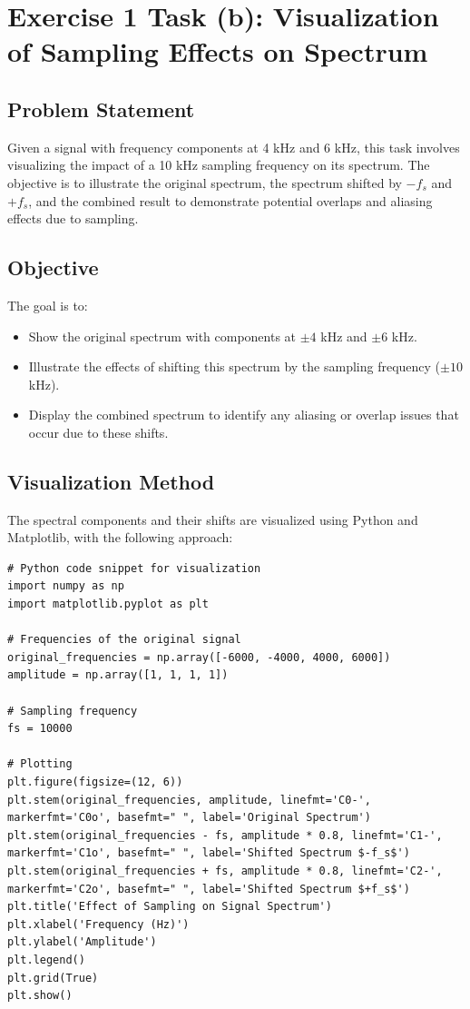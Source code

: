 
\item[(b)]
\section{Exercise 1 Task (b): Visualization of Sampling Effects on Spectrum}

\subsection{Problem Statement}
Given a signal with frequency components at 4 kHz and 6 kHz, this task involves visualizing the impact of a 10 kHz sampling frequency on its spectrum. The objective is to illustrate the original spectrum, the spectrum shifted by $-f_s$ and $+f_s$, and the combined result to demonstrate potential overlaps and aliasing effects due to sampling.

\subsection{Objective}
The goal is to:
\begin{itemize}
    \item Show the original spectrum with components at $\pm 4$ kHz and $\pm 6$ kHz.
    \item Illustrate the effects of shifting this spectrum by the sampling frequency ($\pm 10$ kHz).
    \item Display the combined spectrum to identify any aliasing or overlap issues that occur due to these shifts.
\end{itemize}

\subsection{Visualization Method}
The spectral components and their shifts are visualized using Python and Matplotlib, with the following approach:

\begin{verbatim}
# Python code snippet for visualization
import numpy as np
import matplotlib.pyplot as plt

# Frequencies of the original signal
original_frequencies = np.array([-6000, -4000, 4000, 6000])
amplitude = np.array([1, 1, 1, 1])

# Sampling frequency
fs = 10000

# Plotting
plt.figure(figsize=(12, 6))
plt.stem(original_frequencies, amplitude, linefmt='C0-', markerfmt='C0o', basefmt=" ", label='Original Spectrum')
plt.stem(original_frequencies - fs, amplitude * 0.8, linefmt='C1-', markerfmt='C1o', basefmt=" ", label='Shifted Spectrum $-f_s$')
plt.stem(original_frequencies + fs, amplitude * 0.8, linefmt='C2-', markerfmt='C2o', basefmt=" ", label='Shifted Spectrum $+f_s$')
plt.title('Effect of Sampling on Signal Spectrum')
plt.xlabel('Frequency (Hz)')
plt.ylabel('Amplitude')
plt.legend()
plt.grid(True)
plt.show()
\end{verbatim}


